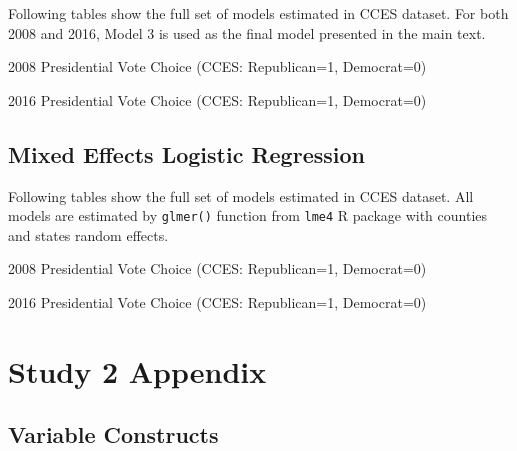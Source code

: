 \par Following tables show the full set of models estimated in CCES dataset. For both 2008 and 2016, Model 3 is used as the final model presented in the main text.

\begin{table}[ht!!!]
    \footnotesize
    \centering
    \caption{2008 Presidential Vote Choice (CCES: Republican=1, Democrat=0)}
    
\end{table}

\begin{table}[ht!!!]
    \footnotesize
    \centering
    \caption{2016 Presidential Vote Choice (CCES: Republican=1, Democrat=0)}
    
\end{table}

\clearpage
\subsection{Mixed Effects Logistic Regression} 

\par Following tables show the full set of models estimated in CCES dataset. All models are estimated by \texttt{glmer()} function from \texttt{lme4} R package with counties and states random effects.

\begin{table}[ht!!!]
    \footnotesize
    \centering
    \caption{2008 Presidential Vote Choice (CCES: Republican=1, Democrat=0)}
    
\end{table}

\begin{table}[ht!!!]
    \footnotesize
    \centering
    \caption{2016 Presidential Vote Choice (CCES: Republican=1, Democrat=0)}
    
\end{table}

\clearpage

\section{Study 2 Appendix} \label{appB}
\setcounter{table}{0}
\renewcommand{\thetable}{B\arabic{table}}
\setcounter{figure}{0}
\renewcommand{\thefigure}{B\arabic{figure}}

\subsection{Variable Constructs}

